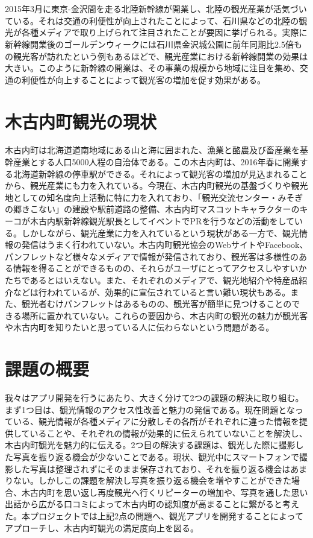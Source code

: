 \section{}
2015年3月に東京-金沢間を走る北陸新幹線が開業し、北陸の観光産業が活気づいている。それは交通の利便性が向上されたことによって、石川県などの北陸の観光が各種メディアで取り上げられて注目されたことが要因に挙げられる。実際に新幹線開業後のゴールデンウィークには石川県金沢城公園に前年同期比2.5倍もの観光客が訪れたという例もあるほどで、観光産業における新幹線開業の効果は大きい。このように新幹線の開業は、その事業の規模から地域に注目を集め、交通の利便性が向上することによって観光客の増加を促す効果がある。

\section{木古内町観光の現状}
木古内町は北海道道南地域にある山と海に囲まれた、漁業と酪農及び畜産業を基幹産業とする人口5000人程の自治体である。この木古内町は、2016年春に開業する北海道新幹線の停車駅ができる。それによって観光客の増加が見込まれることから、観光産業にも力を入れている。今現在、木古内町観光の基盤づくりや観光地としての知名度向上活動に特に力を入れており、「観光交流センター・みそぎの郷きこない」の建設や駅前道路の整備、木古内町マスコットキャラクターのキーコが木古内駅新幹線観光駅長としてイベントでPRを行うなどの活動をしている。しかしながら、観光産業に力を入れているという現状がある一方で、観光情報の発信はうまく行われていない。木古内町観光協会のWebサイトやFacebook、パンフレットなど様々なメディアで情報が発信されており、観光客は多様性のある情報を得ることができるものの、それらがユーザにとってアクセスしやすいかたちであるとはいえない。また、それぞれのメディアで、観光地紹介や特産品紹介などは行われているが、効果的に宣伝されていると言い難い現状もある。また、観光者むけパンフレットはあるものの、観光客が簡単に見つけることのできる場所に置かれていない。これらの要因から、木古内町の観光の魅力が観光客や木古内町を知りたいと思っている人に伝わらないという問題がある。

\section{課題の概要}\label{sec:gaiyou}
我々はアプリ開発を行うにあたり、大きく分けて2つの課題の解決に取り組む。まず1つ目は、観光情報のアクセス性改善と魅力の発信である。現在問題となっている、観光情報が各種メディアに分散しその各所がそれぞれに違った情報を提供していることや、それぞれの情報が効果的に伝えられていないことを解決し、木古内町観光を魅力的に伝える。2つ目の解決する課題は、観光した際に撮影した写真を振り返る機会が少ないことである。現状、観光中にスマートフォンで撮影した写真は整理されずにそのまま保存されており、それを振り返る機会はあまりない。しかしこの課題を解決し写真を振り返る機会を増やすことができた場合、木古内町を思い返し再度観光へ行くリピーターの増加や、写真を通した思い出話から広がる口コミによって木古内町の認知度が高まることに繋がると考えた。本プロジェクトでは上記2点の問題へ、観光アプリを開発することによってアプローチし、木古内町観光の満足度向上を図る。
